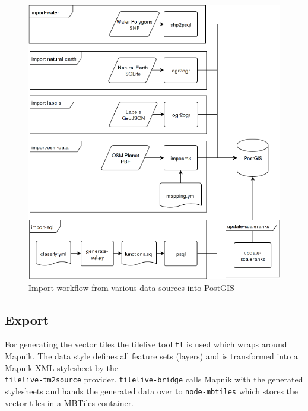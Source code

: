 \begin{figure}[H]
\centering
  \includegraphics[scale=0.6]{images/import_package_flow.png}
  \caption{Import workflow from various data sources into PostGIS}
\end{figure}

\newpage
\subsection{Export}\label{workflow-export}

For generating the vector tiles the tilelive tool \texttt{tl}\cite{5_github_2015} is used which wraps
around Mapnik. 
The data style defines all feature sets (layers) and is transformed into a Mapnik XML stylesheet by the \\
\texttt{tilelive-tm2source} provider.
\texttt{tilelive-bridge} calls Mapnik with the generated stylesheets and hands the generated data over to \texttt{node-mbtiles} which stores the vector tiles in a MBTiles container.

